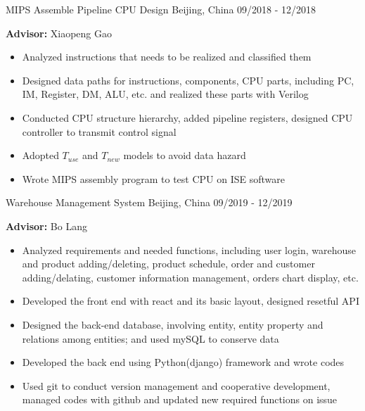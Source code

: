 

\begin{cventries}
  
  \cventry
    {}
    {MIPS Assemble Pipeline CPU Design}
    {Beijing, China}
    {09/2018 - 12/2018}
    {
      \textbf{Advisor:} Xiaopeng Gao
      \begin{itemize}
        \item {Analyzed instructions that needs to be realized and classified them}
        \item {Designed data paths for instructions, components, CPU parts, including PC, IM, Register, DM, ALU, etc. and realized these parts with Verilog}
        \item {Conducted CPU structure hierarchy, added pipeline registers, designed CPU controller to transmit control signal}
        \item {Adopted $T_{use}$ and $T_{new}$ models to avoid data hazard}
        \item {Wrote MIPS assembly program to test CPU on ISE software}
      \end{itemize}
    }

  \cventry
    {}
    {Warehouse Management System}
    {Beijing, China}
    {09/2019 - 12/2019}
    {
      \textbf{Advisor:} Bo Lang
      \begin{itemize}
        \item {Analyzed requirements and needed functions, including user login, warehouse and product adding/deleting, product schedule, order and customer adding/delating, customer information management, orders chart display, etc.}
        \item {Developed the front end with react and its basic layout, designed resetful API}
        \item {Designed the back-end database, involving entity, entity property and relations among entities; and used mySQL to conserve data}
        \item {Developed the back end using Python(django) framework and wrote codes}
        \item {Used git to conduct version management and cooperative development, managed codes with github and updated new required functions on issue}
      \end{itemize}
    }
    
\end{cventries}

